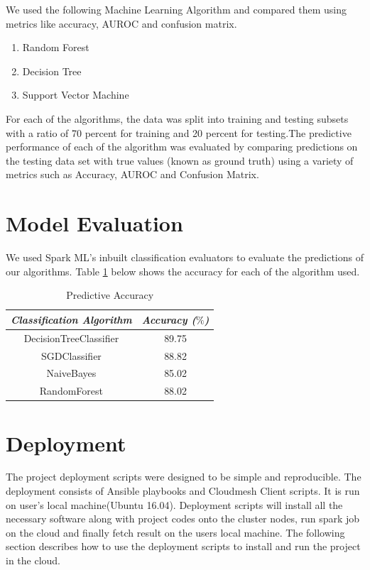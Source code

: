 \documentclass[9pt,twocolumn,twoside]{../../styles/osajnl}
\begin{document}
	We used the following Machine Learning Algorithm and compared them using metrics like accuracy, AUROC and confusion matrix.
		\begin{enumerate}
		\item {Random Forest}
		\item {Decision Tree}  
		\item {Support Vector Machine} 
		\end{enumerate}

	For each of the algorithms, the data was split into training and testing subsets with a ratio of 70 percent for training and 20 percent for testing.The predictive performance of each of the algorithm was evaluated by comparing predictions on the testing data set with true values (known as ground truth) using a variety of metrics such as Accuracy, AUROC and Confusion Matrix.

\section{Model Evaluation}
	We used Spark ML's inbuilt classification evaluators to evaluate the predictions of our algorithms. Table \ref{table:ML} below shows the accuracy for each of the algorithm used.

		\begin{table}[h!]
		\centering
		\begin{tabular}{|c c |} 
		\hline
		\textit{Classification Algorithm} & \textit{Accuracy ($\%$)}\\ 
		\hline
		\hline 
		DecisionTreeClassifier &  89.75\\
		\hline  
		SGDClassifier & 88.82\\
		\hline 
		NaiveBayes & 85.02\\
		\hline 
		RandomForest & 88.02\\
		\hline
		\end{tabular}
		\caption{Predictive Accuracy}
		\label{table:ML}
		\end{table}


\section{Deployment}
	The project deployment scripts were designed to be simple and reproducible. The deployment consists of Ansible playbooks and Cloudmesh Client scripts. It is run on user's local machine(Ubuntu 16.04). Deployment scripts will install all the necessary software along with project codes onto the cluster nodes, run spark job on the cloud and finally fetch result on the users local machine. The following section describes how to use the deployment scripts to install and run the project in the cloud.
	
\end{document}
